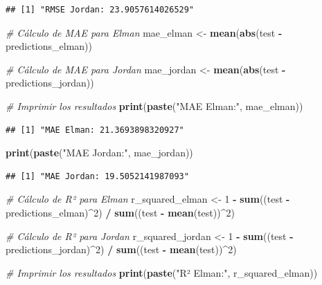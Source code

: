 \documentclass[
]{book}
\newenvironment{Shaded}{\begin{snugshade}}{\end{snugshade}}
\newcommand{\CommentTok}[1]{\textcolor[rgb]{0.56,0.35,0.01}{\textit{#1}}}
\newcommand{\DecValTok}[1]{\textcolor[rgb]{0.00,0.00,0.81}{#1}}
\newcommand{\FunctionTok}[1]{\textcolor[rgb]{0.13,0.29,0.53}{\textbf{#1}}}
\newcommand{\NormalTok}[1]{#1}
\newcommand{\OtherTok}[1]{\textcolor[rgb]{0.56,0.35,0.01}{#1}}
\newcommand{\SpecialCharTok}[1]{\textcolor[rgb]{0.81,0.36,0.00}{\textbf{#1}}}
\newcommand{\StringTok}[1]{\textcolor[rgb]{0.31,0.60,0.02}{#1}}
\begin{document}
\begin{verbatim}
## [1] "RMSE Jordan: 23.9057614026529"
\end{verbatim}

\begin{Shaded}
\begin{Highlighting}[]
\CommentTok{\# Cálculo de MAE para Elman}
\NormalTok{mae\_elman }\OtherTok{\textless{}{-}} \FunctionTok{mean}\NormalTok{(}\FunctionTok{abs}\NormalTok{(test }\SpecialCharTok{{-}}\NormalTok{ predictions\_elman))}

\CommentTok{\# Cálculo de MAE para Jordan}
\NormalTok{mae\_jordan }\OtherTok{\textless{}{-}} \FunctionTok{mean}\NormalTok{(}\FunctionTok{abs}\NormalTok{(test }\SpecialCharTok{{-}}\NormalTok{ predictions\_jordan))}

\CommentTok{\# Imprimir los resultados}
\FunctionTok{print}\NormalTok{(}\FunctionTok{paste}\NormalTok{(}\StringTok{"MAE Elman:"}\NormalTok{, mae\_elman))}
\end{Highlighting}
\end{Shaded}

\begin{verbatim}
## [1] "MAE Elman: 21.3693898320927"
\end{verbatim}

\begin{Shaded}
\begin{Highlighting}[]
\FunctionTok{print}\NormalTok{(}\FunctionTok{paste}\NormalTok{(}\StringTok{"MAE Jordan:"}\NormalTok{, mae\_jordan))}
\end{Highlighting}
\end{Shaded}

\begin{verbatim}
## [1] "MAE Jordan: 19.5052141987093"
\end{verbatim}

\begin{Shaded}
\begin{Highlighting}[]
\CommentTok{\# Cálculo de R² para Elman}
\NormalTok{r\_squared\_elman }\OtherTok{\textless{}{-}} \DecValTok{1} \SpecialCharTok{{-}} \FunctionTok{sum}\NormalTok{((test }\SpecialCharTok{{-}}\NormalTok{ predictions\_elman)}\SpecialCharTok{\^{}}\DecValTok{2}\NormalTok{) }\SpecialCharTok{/} \FunctionTok{sum}\NormalTok{((test }\SpecialCharTok{{-}} \FunctionTok{mean}\NormalTok{(test))}\SpecialCharTok{\^{}}\DecValTok{2}\NormalTok{)}

\CommentTok{\# Cálculo de R² para Jordan}
\NormalTok{r\_squared\_jordan }\OtherTok{\textless{}{-}} \DecValTok{1} \SpecialCharTok{{-}} \FunctionTok{sum}\NormalTok{((test }\SpecialCharTok{{-}}\NormalTok{ predictions\_jordan)}\SpecialCharTok{\^{}}\DecValTok{2}\NormalTok{) }\SpecialCharTok{/} \FunctionTok{sum}\NormalTok{((test }\SpecialCharTok{{-}} \FunctionTok{mean}\NormalTok{(test))}\SpecialCharTok{\^{}}\DecValTok{2}\NormalTok{)}

\CommentTok{\# Imprimir los resultados}
\FunctionTok{print}\NormalTok{(}\FunctionTok{paste}\NormalTok{(}\StringTok{"R² Elman:"}\NormalTok{, r\_squared\_elman))}
\end{Highlighting}
\end{Shaded}
\end{document}
